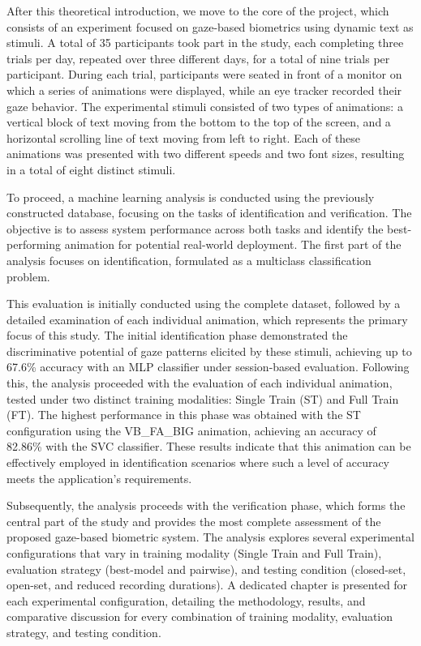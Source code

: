 \documentclass{article}
\begin{document}
After this theoretical introduction, we move to the core of the project, which consists of an experiment focused on gaze-based biometrics using dynamic text as stimuli.
A total of 35 participants took part in the study, each completing three trials per day, repeated over three different days, for a total of nine trials per participant.
During each trial, participants were seated in front of a monitor on which a series of animations were displayed, while an eye tracker recorded their gaze behavior.
The experimental stimuli consisted of two types of animations: a vertical block of text moving from the bottom to the top of the screen, and a horizontal scrolling line of text moving from left to right.
Each of these animations was presented with two different speeds and two font sizes, resulting in a total of eight distinct stimuli.

To proceed, a machine learning analysis is conducted using the previously constructed database, focusing on the tasks of identification and verification.
The objective is to assess system performance across both tasks and identify the best-performing animation for potential real-world deployment.
The first part of the analysis focuses on identification, formulated as a multiclass classification problem. 

This evaluation is initially conducted using the complete dataset, followed by a detailed examination of each individual animation, which represents the primary focus of this study.
The initial identification phase demonstrated the discriminative potential of gaze patterns elicited by these stimuli, achieving up to 67.6\% accuracy with an MLP classifier under session-based evaluation. 
Following this, the analysis proceeded with the evaluation of each individual animation, tested under two distinct training modalities: Single Train (ST) and Full Train (FT). 
The highest performance in this phase was obtained with the ST configuration using the VB\_FA\_BIG animation, achieving an accuracy of 82.86\% with the SVC classifier. 
These results indicate that this animation can be effectively employed in identification scenarios where such a level of accuracy meets the application’s requirements.

Subsequently, the analysis proceeds with the verification phase, which forms the central part of the study and provides the most complete assessment of the proposed gaze-based biometric system.
The analysis explores several experimental configurations that vary in training modality (Single Train and Full Train), evaluation strategy (best-model and pairwise), and testing condition (closed-set, open-set, and reduced recording durations).
A dedicated chapter is presented for each experimental configuration, detailing the methodology, results, and comparative discussion for every combination of training modality, evaluation strategy, and testing condition.
\end{document}
